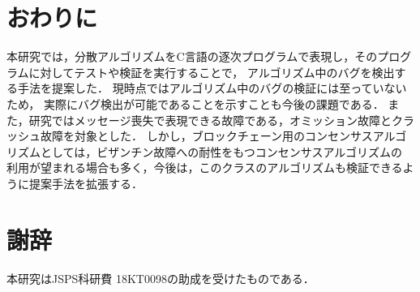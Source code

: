 \documentclass[technicalreport]{ieicej}
\theoremstyle{plain}
\begin{document}
\section{おわりに}\label{sec:conclusion}

本研究では，分散アルゴリズムをC言語の逐次プログラムで表現し，そのプログラムに対してテストや検証を実行することで，
アルゴリズム中のバグを検出する手法を提案した．
現時点ではアルゴリズム中のバグの検証には至っていないため，
実際にバグ検出が可能であることを示すことも今後の課題である．
また，研究ではメッセージ喪失で表現できる故障である，オミッション故障とクラッシュ故障を対象とした．
しかし，ブロックチェーン用のコンセンサスアルゴリズムとしては，ビザンチン故障への耐性をもつコンセンサスアルゴリズムの
利用が望まれる場合も多く，今後は，このクラスのアルゴリズムも検証できるように提案手法を拡張する．

\section*{謝辞}
本研究はJSPS科研費 18KT0098の助成を受けたものである．





\end{document}
